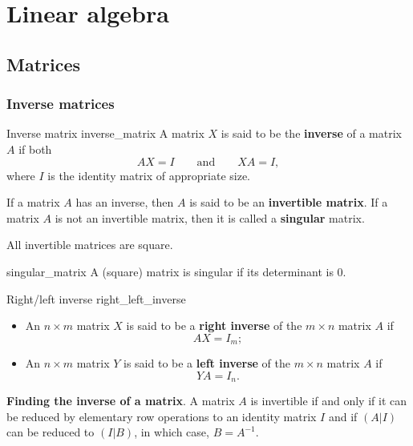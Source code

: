 \section{Linear algebra}

\subsection{Matrices}

\subsubsection{Inverse matrices}

\begin{definition}{Inverse matrix \cite{math1141_notes}}{inverse_matrix}
A matrix $X$ is said to be the \textbf{inverse} of a matrix $A$ if both
$$ AX = I \qquad \text{and} \qquad XA = I , $$
where $I$ is the identity matrix of appropriate size.
\end{definition}

If a matrix $A$ has an inverse, then $A$ is said to be an \textbf{invertible matrix}. If a matrix $A$ is not an invertible matrix, then it is called a \textbf{singular} matrix.

\begin{lemma}{\cite{math1141_notes}}{}
All invertible matrices are square.
\end{lemma}

\begin{lemma}{}{singular_matrix}
A (square) matrix is singular if its determinant is $0$.
\end{lemma}

\begin{definition}{Right/left inverse \cite{math1141_notes}}{right_left_inverse}
\begin{itemize}
	\item An $n \times m$ matrix $X$ is said to be a \textbf{right inverse} of the $m \times n$ matrix $A$ if
$$ AX = I_m ; $$

	\item An $n \times m$ matrix $Y$ is said to be a \textbf{left inverse} of the $m \times n$ matrix $A$ if
$$ YA = I_n . $$
\end{itemize}
\end{definition}

\textbf{Finding the inverse of a matrix}. A matrix $A$ is invertible if and only if it can be reduced by elementary row operations to an identity matrix $I$ and if $(A|I)$ can be reduced to $(I|B)$, in which case, $B = A^{-1}$.

